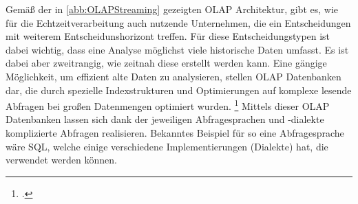 Gemäß der in \autoref{abb:OLAPStreaming} gezeigten \ac{OLAP} Architektur, gibt es, wie für die Echtzeitverarbeitung auch nutzende Unternehmen, die ein Entscheidungen mit weiterem Entscheidunshorizont treffen. Für diese Entscheidungstypen ist dabei wichtig, dass eine Analyse möglichst viele historische Daten umfasst. Es ist dabei aber zweitrangig, wie zeitnah diese erstellt werden kann. 
Eine gängige Möglichkeit, um effizient alte Daten zu analysieren, stellen \ac{OLAP} Datenbanken dar, die durch spezielle Indexstrukturen und Optimierungen auf komplexe lesende Abfragen bei großen Datenmengen optimiert wurden. \footcite[Vgl.][5\psq]{Codd.1993} Mittels dieser \ac{OLAP} Datenbanken lassen sich dank der jeweiligen Abfragesprachen und -dialekte komplizierte Abfragen realisieren. Bekanntes Beispiel für so eine Abfragesprache wäre \ac{SQL}, welche einige verschiedene Implementierungen (Dialekte) hat, die verwendet werden können. 